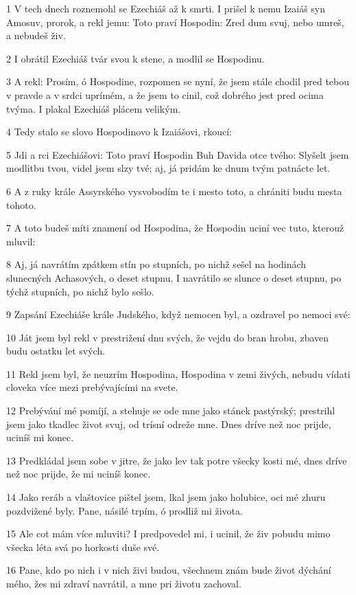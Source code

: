 \par 1 V tech dnech roznemohl se Ezechiáš až k smrti. I prišel k nemu Izaiáš syn Amosuv, prorok, a rekl jemu: Toto praví Hospodin: Zred dum svuj, nebo umreš, a nebudeš živ.
\par 2 I obrátil Ezechiáš tvár svou k stene, a modlil se Hospodinu.
\par 3 A rekl: Prosím, ó Hospodine, rozpomen se nyní, že jsem stále chodil pred tebou v pravde a v srdci uprímém, a že jsem to cinil, což dobrého jest pred ocima tvýma. I plakal Ezechiáš plácem velikým.
\par 4 Tedy stalo se slovo Hospodinovo k Izaiášovi, rkoucí:
\par 5 Jdi a rci Ezechiášovi: Toto praví Hospodin Buh Davida otce tvého: Slyšelt jsem modlitbu tvou, videl jsem slzy tvé; aj, já pridám ke dnum tvým patnácte let.
\par 6 A z ruky krále Assyrského vysvobodím te i mesto toto, a chrániti budu mesta tohoto.
\par 7 A toto budeš míti znamení od Hospodina, že Hospodin uciní vec tuto, kterouž mluvil:
\par 8 Aj, já navrátím zpátkem stín po stupních, po nichž sešel na hodinách slunecných Achasových, o deset stupnu. I navrátilo se slunce o deset stupnu, po týchž stupních, po nichž bylo sešlo.
\par 9 Zapsání Ezechiáše krále Judského, když nemocen byl, a ozdravel po nemoci své:
\par 10 Ját jsem byl rekl v prestrižení dnu svých, že vejdu do bran hrobu, zbaven budu ostatku let svých.
\par 11 Rekl jsem byl, že neuzrím Hospodina, Hospodina v zemi živých, nebudu vídati cloveka více mezi prebývajícími na svete.
\par 12 Prebývání mé pomíjí, a stehuje se ode mne jako stánek pastýrský; prestrihl jsem jako tkadlec život svuj, od trísní odreže mne. Dnes dríve než noc prijde, uciníš mi konec.
\par 13 Predkládal jsem sobe v jitre, že jako lev tak potre všecky kosti mé, dnes dríve než noc prijde, že mi uciníš konec.
\par 14 Jako reráb a vlaštovice pištel jsem, lkal jsem jako holubice, oci mé zhuru pozdvižené byly. Pane, násilé trpím, ó prodliž mi života.
\par 15 Ale cot mám více mluviti? I predpovedel mi, i ucinil, že živ pobudu mimo všecka léta svá po horkosti duše své.
\par 16 Pane, kdo po nich i v nich živi budou, všechnem znám bude život dýchání mého, žes mi zdraví navrátil, a mne pri životu zachoval.
